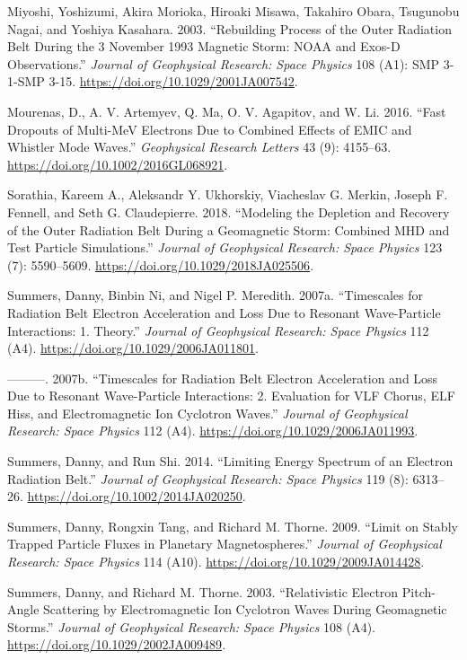 \documentclass[
  letterpaper,
  DIV=11,
  numbers=noendperiod]{scrartcl}
\newlength{\cslhangindent}
\newenvironment{CSLReferences}[2] %
 {\begin{list}{}{%
  \setlength{\itemindent}{0pt}
  \setlength{\leftmargin}{0pt}
  \setlength{\parsep}{0pt}
  \ifodd #1
   \setlength{\leftmargin}{\cslhangindent}
   \setlength{\itemindent}{-1\cslhangindent}
  \fi
  \setlength{\itemsep}{#2\baselineskip}}}
 {\end{list}}
\begin{document}
\begin{CSLReferences}{1}{0}
Miyoshi, Yoshizumi, Akira Morioka, Hiroaki Misawa, Takahiro Obara, Tsugunobu Nagai, and Yoshiya Kasahara. 2003. {``Rebuilding Process of the Outer Radiation Belt During the 3 {November} 1993 Magnetic Storm: {NOAA} and {Exos-D} Observations.''} \emph{Journal of Geophysical Research: Space Physics} 108 (A1): SMP 3-1-SMP 3-15. \url{https://doi.org/10.1029/2001JA007542}.

Mourenas, D., A. V. Artemyev, Q. Ma, O. V. Agapitov, and W. Li. 2016. {``Fast Dropouts of Multi-{MeV} Electrons Due to Combined Effects of {EMIC} and Whistler Mode Waves.''} \emph{Geophysical Research Letters} 43 (9): 4155--63. \url{https://doi.org/10.1002/2016GL068921}.

Sorathia, Kareem A., Aleksandr Y. Ukhorskiy, Viacheslav G. Merkin, Joseph F. Fennell, and Seth G. Claudepierre. 2018. {``Modeling the {Depletion} and {Recovery} of the {Outer Radiation Belt During} a {Geomagnetic Storm}: {Combined MHD} and {Test Particle Simulations}.''} \emph{Journal of Geophysical Research: Space Physics} 123 (7): 5590--5609. \url{https://doi.org/10.1029/2018JA025506}.

Summers, Danny, Binbin Ni, and Nigel P. Meredith. 2007a. {``Timescales for Radiation Belt Electron Acceleration and Loss Due to Resonant Wave-Particle Interactions: 1. {Theory}.''} \emph{Journal of Geophysical Research: Space Physics} 112 (A4). \url{https://doi.org/10.1029/2006JA011801}.

---------. 2007b. {``Timescales for Radiation Belt Electron Acceleration and Loss Due to Resonant Wave-Particle Interactions: 2. {Evaluation} for {VLF} Chorus, {ELF} Hiss, and Electromagnetic Ion Cyclotron Waves.''} \emph{Journal of Geophysical Research: Space Physics} 112 (A4). \url{https://doi.org/10.1029/2006JA011993}.

Summers, Danny, and Run Shi. 2014. {``Limiting Energy Spectrum of an Electron Radiation Belt.''} \emph{Journal of Geophysical Research: Space Physics} 119 (8): 6313--26. \url{https://doi.org/10.1002/2014JA020250}.

Summers, Danny, Rongxin Tang, and Richard M. Thorne. 2009. {``Limit on Stably Trapped Particle Fluxes in Planetary Magnetospheres.''} \emph{Journal of Geophysical Research: Space Physics} 114 (A10). \url{https://doi.org/10.1029/2009JA014428}.

Summers, Danny, and Richard M. Thorne. 2003. {``Relativistic Electron Pitch-Angle Scattering by Electromagnetic Ion Cyclotron Waves During Geomagnetic Storms.''} \emph{Journal of Geophysical Research: Space Physics} 108 (A4). \url{https://doi.org/10.1029/2002JA009489}.

\end{CSLReferences}
\end{document}

